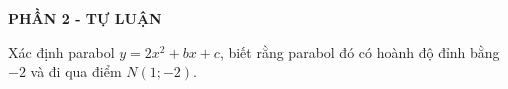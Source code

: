 


\begin{center}
	\textbf{PHẦN 2 - TỰ LUẬN}
\end{center}
\begin{bt}%
	Xác định parabol $y=2x^2+bx+c$, biết rằng parabol đó có hoành độ đỉnh bằng $-2$ và đi qua điểm $N(1;-2)$.
\end{bt}

